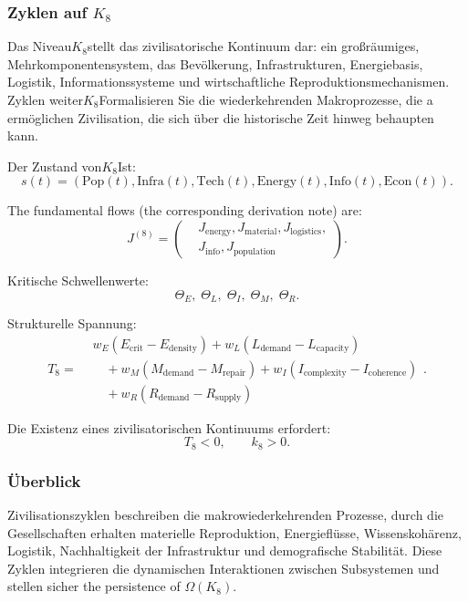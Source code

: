 
\subsubsection{Zyklen auf \texorpdfstring{$K_8$}{K_8}}
\label{sec:cycles-k8}

Das Niveau$K_8$stellt das zivilisatorische Kontinuum dar: ein großräumiges,
Mehrkomponentensystem, das Bevölkerung, Infrastrukturen, Energiebasis,
Logistik, Informationssysteme und wirtschaftliche Reproduktionsmechanismen.
Zyklen weiter$K_8$Formalisieren Sie die wiederkehrenden Makroprozesse, die a ermöglichen
Zivilisation, die sich über die historische Zeit hinweg behaupten kann.

Der Zustand von$K_8$Ist:
\[
  s(t) = (\text{Pop}(t), \text{Infra}(t), \text{Tech}(t),
           \text{Energy}(t), \text{Info}(t), \text{Econ}(t)).
\]

The fundamental flows (the corresponding derivation note) are:
\[
J^{(8)} =
  \left(
  \begin{aligned}
   &J_{\mathrm{energy}}, J_{\mathrm{material}}, J_{\mathrm{logistics}},\\
   &J_{\mathrm{info}}, J_{\mathrm{population}}
  \end{aligned}
  \right).
\]

Kritische Schwellenwerte:
\[
  \Theta_E,\;
  \Theta_L,\;
  \Theta_I,\;
  \Theta_M,\;
  \Theta_R.
\]

Strukturelle Spannung:
\[
T_8 =
  \begin{aligned}
    &w_E(E_{\mathrm{crit}} - E_{\mathrm{density}})
    + w_L(L_{\mathrm{demand}} - L_{\mathrm{capacity}})\\
    &\quad + w_M(M_{\mathrm{demand}} - M_{\mathrm{repair}})
    + w_I(I_{\mathrm{complexity}} - I_{\mathrm{coherence}})\\
    &\quad + w_R(R_{\mathrm{demand}} - R_{\mathrm{supply}})
  \end{aligned}
  .
\]

Die Existenz eines zivilisatorischen Kontinuums erfordert:
\[
  T_8 < 0,\qquad k_8>0.
\]

\subsubsection{Überblick}

Zivilisationszyklen beschreiben die makrowiederkehrenden Prozesse, durch die
Gesellschaften erhalten materielle Reproduktion, Energieflüsse, Wissenskohärenz,
Logistik, Nachhaltigkeit der Infrastruktur und demografische Stabilität.
Diese Zyklen integrieren die dynamischen Interaktionen zwischen Subsystemen und stellen sicher
the persistence of $\Omega(K_8)$.

